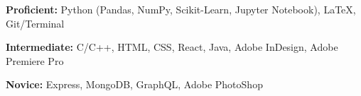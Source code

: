 
\textbf{Proficient:} Python (Pandas, NumPy, Scikit-Learn, Jupyter Notebook), LaTeX, Git/Terminal

\textbf{Intermediate:} C/C++, HTML, CSS, React, Java, Adobe InDesign, Adobe Premiere Pro

\textbf{Novice:} Express, MongoDB, GraphQL, Adobe PhotoShop
